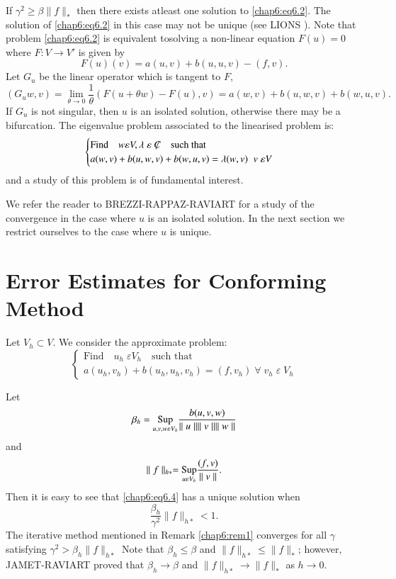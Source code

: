 \begin{REM}\label{chap6:rem2}
If $\gamma^2\geq\beta\parallel f\parallel_*$ then there exists atleast
one solution to \eqref{chap6:eq6.2}. The solution of
\eqref{chap6:eq6.2} in this case may not be unique (see LIONS
\cite{key28}). Note that problem \eqref{chap6:eq6.2} is equivalent
to\pageoriginale solving a non-linear equation $F(u)=0$ where $F:V\to
V'$ is given by
$$
F(u)(v)=a(u,v)+b(u,u,v)-(f,v).
$$
Let $G_u$ be the linear operator which is tangent to $F$, \ie 
$$
(G_u w,v)=\lim\limits_{\theta\to 0}\frac{1}{\theta}(F(u+\theta
w)-F(u),v)=a(w,v)+b(u,w,v)+b(w,u,v).
$$
If $G_u$ is not singular, then $u$ is an isolated solution, otherwise
there may be a bifurcation. The eigenvalue problem associated to the
linearised problem is: 
\begin{equation*}
\begin{cases}
\text{Find}\quad w\varepsilon V,\lambda\;\varepsilon \not\kern -3pt C
\quad\text{such that}\\
a(w,v)+b(u,w,v)+b(w,u,v)=\lambda(w,v)\; \; v\;\varepsilon V
\end{cases}
\end{equation*}
and a study of this problem is of fundamental interest.

We refer the reader to BREZZI-RAPPAZ-RAVIART \cite{key6} for a study of the
convergence in the case where $u$ is an isolated solution. In the next
section we restrict ourselves to the case where $u$ is unique.
\end{REM}

\section{Error Estimates for Conforming  Method} \label{chap6:ssec6.8} 
Let $V_h\subset V$. We consider the approximate problem:
\begin{equation}\label{chap6:eq6.4}
\begin{cases}
\text{Find}\quad u_h\;\varepsilon V_h\quad\text{such that}\\
a(u_h,v_h)+b(u_h,u_h,v_h)=(f,v_h) \; \forall\;v_h\;\varepsilon\;V_h
\end{cases}
\end{equation}

Let
$$
\beta_h=\underset{u,v,w\varepsilon V_h}{\operatorname{Sup}}\frac{b(u,v,w)}
{\parallel u\parallel \parallel v\parallel \parallel w\parallel} 
$$
and\pageoriginale 
$$
\parallel f\parallel_{h*}=\underset{u\varepsilon V_h}{\operatorname{Sup}}
\frac{(f,v)}{\parallel v\parallel}.
$$
Then it is easy to see that \eqref{chap6:eq6.4} has a unique solution
when 
$$
\frac{\beta_h}{\gamma^2}\parallel f\parallel_{h*} <1.
$$
The iterative method mentioned in Remark \ref{chap6:rem1} converges
for all $\gamma$ satisfying $\gamma^2 >\beta_h\parallel
f\parallel_{h*}$ Note that $\beta_h\leq\beta$ and $\parallel
f\parallel_{h*}\leq\parallel f\parallel_*$; however, JAMET-RAVIART
\cite{key23} proved that $\beta_h\to\beta$ and $\parallel
f\parallel_{h*}\to\parallel f\parallel_*$ as $h\to 0$. 

